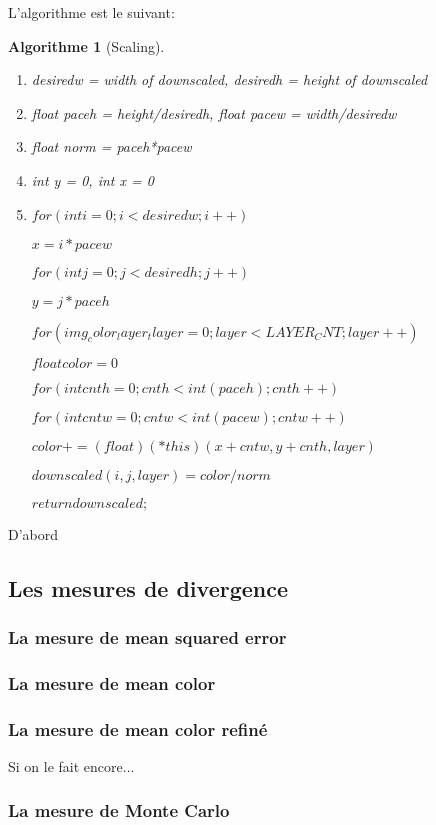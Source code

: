 \documentclass[a4paper]{article}
\newtheorem{algo}{Algorithme}
\begin{document}
L'algorithme est le suivant:
\begin{algo}[Scaling]
\begin{enumerate}
\item desiredw = width of downscaled,
	  desiredh = height of downscaled
\item float paceh = height/desiredh, float pacew = width/desiredw
\item float norm = paceh*pacew
\item int y = 0, int x = 0
\item $for(int i = 0; i < desiredw; i++)$

		$x=i*pacew$
		
		$for(int j = 0; j < desiredh; j++)$
		
		$y = j*paceh$
		
			$for(img_color_layer_t layer = 0; layer < LAYER_CNT; layer++)$
			
				$float color = 0$
				
				$for (int cnth = 0; cnth < int(paceh); cnth++)$
				
					$for (int cntw = 0; cntw < int(pacew); cntw++)$
					
						$color += (float)(*this)(x + cntw, y + cnth, layer)$
						
				
				$downscaled(i, j, layer) = color/norm$

	
	$return downscaled;$
\end{enumerate}
\end{algo}




 D'abord

\subsection{Les mesures de divergence}
\subsubsection{La mesure de mean squared error}
\subsubsection{La mesure de mean color}
\subsubsection{La mesure de mean color refin\'e}
Si on le fait encore...
\subsubsection{La mesure de Monte Carlo}
\end{document}

